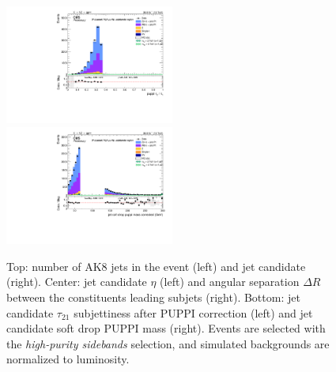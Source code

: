 \begin{figure}[!htb]
\begin{center}
    \includegraphics[width=0.495\textwidth]{plots/v9_U/XVZnnhpSB/FatJet1_puppiTau21.pdf}
    \includegraphics[width=0.495\textwidth]{plots/v9_U/XVZnnhpSB/FatJet1_softdropPuppiMassCorr.pdf}

    \caption{Top: number of AK8 jets in the event (left) and \V jet candidate \pt (right). Center: \V jet candidate $\eta$ (left) and angular separation $\Delta R$ between the constituents leading subjets (right). Bottom: \V jet candidate $\tau_{21}$ subjettiness after PUPPI correction (left) and \V jet candidate soft drop PUPPI mass (right). Events are selected with the \emph{high-purity sidebands} selection, and simulated backgrounds are normalized to luminosity.}
  \end{center}
\end{figure}

\clearpage

